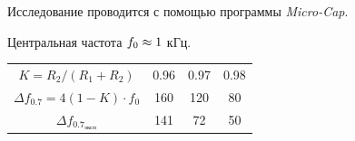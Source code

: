 \documentclass[a4paper, 12pt, twoside]{article}
\newcommand*{\hm}[1]{#1\nobreak\discretionary{}
	{\hbox{$\mathsurround=0pt #1$}}{}}
\begin{document}
Исследование проводится с помощью программы \textit{Micro-Cap}.

\begin{center}
	Центральная частота $f_0 \hm{\approx} 1$ кГц.
\end{center}

\begin{table}[H]
	\centering
	\begin{tabular}{c|ccc}
		\toprule
		$K = R_2/(R_1+R_2)$ & 0.96 & 0.97 & 0.98   \\
		$\Delta f_{0.7} =4(1-K)\cdot f_0 $&160& 120 & 80\\
		$\Delta f_{0.7_{\text{эксп}}}$ &141&72&50\\ \bottomrule
	\end{tabular}
\end{table}
\end{document}
